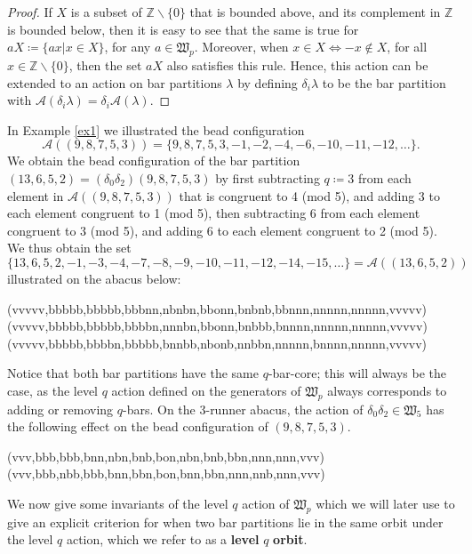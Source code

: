 \documentclass[ALCO, Unicode,published]{cedram}
\begin{document}
\begin{proof}
If $X$ is a subset of $\mathbb{Z}\backslash\{0\}$ that is bounded above, and its complement in $\mathbb{Z}$ is bounded below, then it is easy to see that the same is true for $aX\coloneqq\{ax|x\in X\}$, for any $a\in\mathfrak{W}_p$. Moreover, when $x\in X\Leftrightarrow-x\not\in X$, for all $x\in\mathbb{Z}\backslash\{0\}$, then the set $aX$ also satisfies this rule. 
Hence, this action can be extended to an action on bar partitions $\lambda$ by defining $\delta_i\lambda$ to be the bar partition with $\mathcal{A}(\delta_i\lambda)=\delta_i\mathcal{A}(\lambda)$.
\end{proof}

\begin{exam}\label{ex6}
In Example \ref{ex1} we illustrated the bead configuration 
$$\mathcal{A}((9,8,7,5,3))=\{9,8,7,5,3,-1,-2,-4,-6,-10,-11,-12,\dots\}.$$ 
We obtain the bead configuration of the bar partition $(13,6,5,2)=(\delta_0\delta_2)(9,8,7,5,3)$ by first subtracting $q\coloneqq 3$ from each element in $\mathcal{A}((9,8,7,5,3))$ that is congruent to 4 (mod 5), and adding 3 to each element congruent to 1 (mod 5), then subtracting 6 from each element congruent to 3 (mod 5), and adding 6 to each element congruent to 2 (mod 5). We thus obtain the set 
$$\{13,6,5,2,-1,-3,-4,-7,-8,-9,-10,-11,-12,-14,-15,\dots\}=\mathcal{A}((13,6,5,2))$$ 
illustrated on the abacus below: 
\begin{center}\abacus(vvvvv,bbbbb,bbbbb,bbbnn,nbnbn,bbonn,bnbnb,bbnnn,nnnnn,nnnnn,vvvvv)\:\:\abacus(vvvvv,bbbbb,bbbbb,bbbbn,nnnbn,bbonn,bnbbb,bnnnn,nnnnn,nnnnn,vvvvv)\:\:\abacus(vvvvv,bbbbb,bbbbn,bbbbb,bnnbb,nbonb,nnbbn,nnnnn,bnnnn,nnnnn,vvvvv)\end{center}
Notice that both bar partitions have the same $q$-bar-core; this will always be the case, as the level $q$ action defined on the generators of $\mathfrak{W}_p$ always corresponds to adding or removing $q$-bars. On the 3-runner abacus, the action of $\delta_0\delta_2\in\mathfrak{W}_5$ has the following effect on the bead configuration of $(9,8,7,5,3)$. 
\begin{center}\abacus(vvv,bbb,bbb,bnn,nbn,bnb,bon,nbn,bnb,bbn,nnn,nnn,vvv)\:\:\abacus(vvv,bbb,nbb,bbb,bnn,bbn,bon,bnn,bbn,nnn,nnb,nnn,vvv)\end{center}
\end{exam}

We now give some invariants of the level $q$ action of $\mathfrak{W}_p$ which we will later use to give an explicit criterion for when two bar partitions lie in the same orbit under the level $q$ action, which we refer to as a \textbf{level} $q$ \textbf{orbit}.
\end{document}
